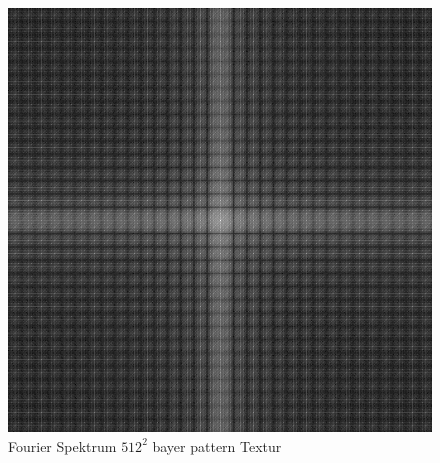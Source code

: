 \begin{figure}[H]
\begin{minipage}[t]{0.45\linewidth}
        \includegraphics[width=\linewidth]{content/BlueNoise/Bilder/FFT_BayerMatrix.png}
        \caption{Fourier Spektrum $512^{2}$ bayer pattern Textur}
    \end{minipage}
\end{figure}

